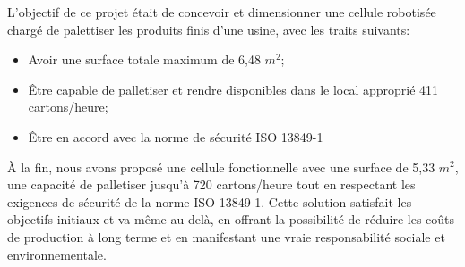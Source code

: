 
L’objectif de ce projet était de concevoir et dimensionner une cellule robotisée chargé de palettiser les produits finis d’une usine, avec les traits suivants:
\begin{itemize}[label=$\bullet$]
\item Avoir une surface totale maximum de 6,48 $m^2$;
\item Être capable de palletiser et rendre disponibles dans le local approprié 411 cartons/heure;
\item Être en accord avec la norme de sécurité ISO 13849-1


\end{itemize}

À la fin, nous avons proposé une cellule fonctionnelle avec une surface de 5,33 $ m^2 $, une capacité de palletiser jusqu’à 720 cartons/heure tout en respectant les exigences de sécurité de la norme ISO 13849-1.
Cette solution satisfait les objectifs initiaux et va même au-delà, en offrant la possibilité de réduire les coûts de production à long terme et en manifestant une vraie responsabilité sociale et environnementale.